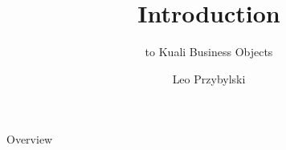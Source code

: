 \documentclass[xcolor=dvipsnames,14pt]{beamer}
\begin{document}
\title{Introduction}
\subtitle{to Kuali Business Objects}
\author[Leo]{Leo Przybylski}

\begin{frame}[plain]
  \titlepage
\end{frame}

\begin{frame}{Overview}
\end{frame}
\end{document}
